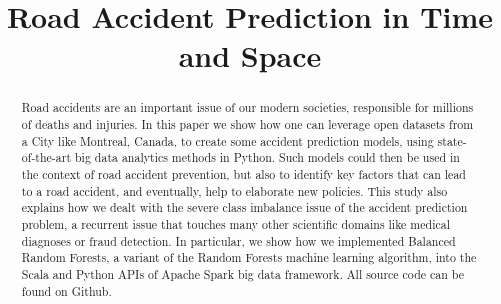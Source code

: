 \documentclass[conference]{IEEEtran}
\begin{document}
\title{Road Accident Prediction in Time and Space}

\author{
\and
{}
\and
{}
\and
{}
}

\maketitle

\begin{abstract}
Road accidents are an important issue of our modern societies, responsible for millions of deaths and injuries. In this paper we show how one can leverage open datasets from a City like Montreal, Canada, to create some accident prediction models, using state-of-the-art big data analytics methods in Python. Such models could then be used in the context of road accident prevention, but also to identify key factors that can lead to a road accident, and eventually, help to elaborate new policies. This study also explains how we dealt with the severe class imbalance issue of the accident prediction problem, a recurrent issue that touches many other scientific domains like medical diagnoses or fraud detection. In particular, we show how we implemented Balanced Random Forests, a variant of the Random Forests machine learning algorithm, into the Scala and Python APIs of Apache Spark big data framework. All source code can be found on Github.
\end{abstract}
\end{document}
